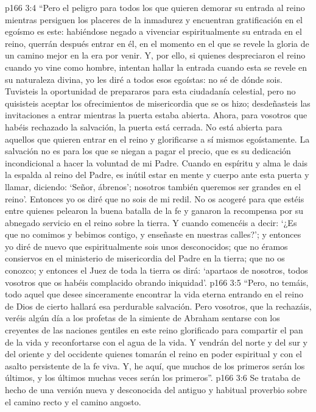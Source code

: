 \vs p166 3:4 “Pero el peligro para todos los que quieren demorar su entrada al reino mientras persiguen los placeres de la inmadurez y encuentran gratificación en el egoísmo es este: habiéndose negado a vivenciar espiritualmente su entrada en el reino, querrán después entrar en él, en el momento en el que se revele la gloria de un camino mejor en la era por venir. Y, por ello, si quienes despreciaron el reino cuando yo vine como hombre, intentan hallar la entrada cuando esta se revele en su naturaleza divina, yo les diré a todos esos egoístas: no sé de dónde sois. Tuvisteis la oportunidad de prepararos para esta ciudadanía celestial, pero no quisisteis aceptar los ofrecimientos de misericordia que se os hizo; desdeñasteis las invitaciones a entrar mientras la puerta estaba abierta. Ahora, para vosotros que habéis rechazado la salvación, la puerta está cerrada. No está abierta para aquellos que quieren entrar en el reino y glorificarse a sí mismos egoístamente. La salvación no es para los que se niegan a pagar el precio, que es su dedicación incondicional a hacer la voluntad de mi Padre. Cuando en espíritu y alma le dais la espalda al reino del Padre, es inútil estar en mente y cuerpo ante esta puerta y llamar, diciendo: ‘Señor, ábrenos’; nosotros también queremos ser grandes en el reino’. Entonces yo os diré que no sois de mi redil. No os acogeré para que estéis entre quienes pelearon la buena batalla de la fe y ganaron la recompensa por su abnegado servicio en el reino sobre la tierra. Y cuando comencéis a decir: ‘¿Es que no comimos y bebimos contigo, y enseñaste en nuestras calles?’; y entonces yo diré de nuevo que espiritualmente sois unos desconocidos; que no éramos consiervos en el ministerio de misericordia del Padre en la tierra; que no os conozco; y entonces el Juez de toda la tierra os dirá: ‘apartaos de nosotros, todos vosotros que os habéis complacido obrando iniquidad’.
\vs p166 3:5 “Pero, no temáis, todo aquel que desee sinceramente encontrar la vida eterna entrando en el reino de Dios de cierto hallará esa perdurable salvación. Pero vosotros, que la rechazáis, veréis algún día a los profetas de la simiente de Abraham sentarse con los creyentes de las naciones gentiles en este reino glorificado para compartir el pan de la vida y reconfortarse con el agua de la vida. Y vendrán del norte y del sur y del oriente y del occidente quienes tomarán el reino en poder espiritual y con el asalto persistente de la fe viva. Y, he aquí, que muchos de los primeros serán los últimos, y los últimos muchas veces serán los primeros”.
\vs p166 3:6 Se trataba de hecho de una versión nueva y desconocida del antiguo y habitual proverbio sobre el camino recto y el camino angosto.
